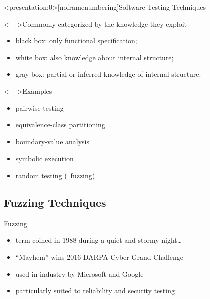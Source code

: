 \documentclass[handout]{beamer}
\begin{document}
\begin{frame}<presentation:0>[noframenumbering]{Software Testing Techniques}
    \begin{block}<+->{Commonly categorized by the knowledge they exploit}
        \begin{itemize}[<+->]
            \item{} black box: only functional specification;
            \item{} white box: also knowledge about internal structure;
            \item{} gray box: partial or inferred knowledge of internal structure.
        \end{itemize}
    \end{block}
    \begin{exampleblock}<+->{Examples}
        \begin{itemize}[<+->]
            \item{} pairwise testing
            \item{} equivalence-class partitioning
            \item{} boundary-value analysis
            \item{} symbolic execution
            \item{} random testing (\ie~\alert{fuzzing})
        \end{itemize}
    \end{exampleblock}
\end{frame}

\subsection{Fuzzing Techniques}

\begin{frame}{Fuzzing}
    \begin{itemize}[<+->]
        \item{} term coined in 1988 during a quiet and stormy night\ldots\
        \item{} ``Mayhem'' wins 2016 DARPA Cyber Grand Challenge
        \item{} used in industry by Microsoft and Google
        \item{} particularly suited to reliability and security testing
    \end{itemize}
\end{frame}
\end{document}
